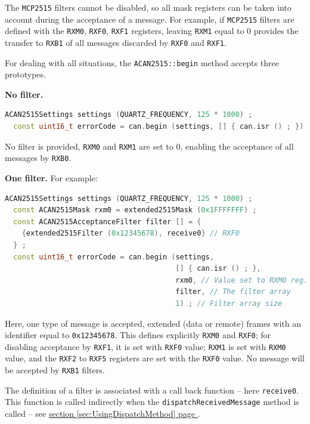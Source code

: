 \documentclass[10pt, a4paper, obeyspaces]{extarticle}
\newcommand\refSectionPage[1]{\hyperref[sec:#1]{section \ref*{sec:#1} page \pageref{sec:#1}}}
\begin{document}
The \texttt{MCP2515} filters cannot be disabled, so all mask registers can be taken into account during the acceptance of a message. For example, if \texttt{MCP2515} filters are defined with the \texttt{RXM0}, \texttt{RXF0}, \texttt{RXF1} registers, leaving \texttt{RXM1} equal to $0$ provides the transfer to \texttt{RXB1} of all messages discarded by \texttt{RXF0} and \texttt{RXF1}.

For dealing with all situations, the \texttt{ACAN2515::begin} method accepts three prototypes.

{\bf No filter.}
{ \small\begin{lstlisting}[language=c++]
  ACAN2515Settings settings (QUARTZ_FREQUENCY, 125 * 1000) ;
  const uint16_t errorCode = can.begin (settings, [] { can.isr () ; }) ;
\end{lstlisting}}
No filter is provided, \texttt{RXM0} and \texttt{RXM1} are set to $0$, enabling the acceptance of all messages by \texttt{RXB0}.



{\bf One filter.} For example:
{ \small\begin{lstlisting}[language=c++]
  ACAN2515Settings settings (QUARTZ_FREQUENCY, 125 * 1000) ;
  const ACAN2515Mask rxm0 = extended2515Mask (0x1FFFFFFF) ;
  const ACAN2515AcceptanceFilter filter [] = {
    {extended2515Filter (0x12345678), receive0} // RXF0
  } ;
  const uint16_t errorCode = can.begin (settings,
                                        [] { can.isr () ; },
                                        rxm0, // Value set to RXM0 register
                                        filter, // The filter array
                                        1) ; // Filter array size
\end{lstlisting}}

Here, one type of message is accepted, extended (data or remote) frames with an identifier equal to \texttt{0x12345678}. This defines explicitly \texttt{RXM0} and \texttt{RXF0}; for disabling acceptance by \texttt{RXF1}, it is set with \texttt{RXF0} value; \texttt{RXM1} is set with \texttt{RXM0} value, and the \texttt{RXF2} to \texttt{RXF5} registers are set with the \texttt{RXF0} value. No message will be accepted by \texttt{RXB1} filters.

The definition of a filter is associated with a call back function -- here \texttt{receive0}. This function is called indirectly when the \texttt{dispatchReceivedMessage} method is called -- see \refSectionPage{UsingDispatchMethod}.
\end{document}
